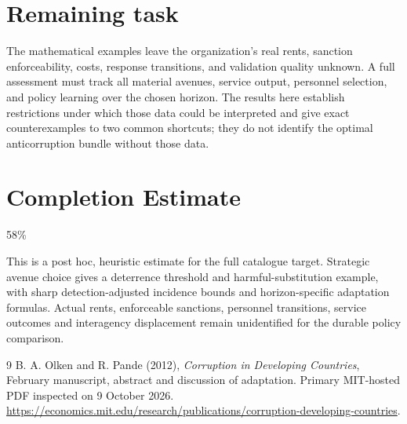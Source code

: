 \documentclass[11pt]{article}
\begin{document}
\section*{Remaining task}
The mathematical examples leave the organization's real rents, sanction enforceability, costs, response transitions, and validation quality unknown. A full assessment must track all material avenues, service output, personnel selection, and policy learning over the chosen horizon. The results here establish restrictions under which those data could be interpreted and give exact counterexamples to two common shortcuts; they do not identify the optimal anticorruption bundle without those data.

\section{Completion Estimate}
58\%

This is a post hoc, heuristic estimate for the full catalogue target.
Strategic avenue choice gives a deterrence threshold and harmful-substitution example, with sharp detection-adjusted incidence bounds and horizon-specific adaptation formulas. Actual rents, enforceable sanctions, personnel transitions, service outcomes and interagency displacement remain unidentified for the durable policy comparison.

\begin{thebibliography}{9}
 B. A. Olken and R. Pande (2012), \emph{Corruption in Developing Countries}, February manuscript, abstract and discussion of adaptation. Primary MIT-hosted PDF inspected on 9 October 2026. \url{https://economics.mit.edu/research/publications/corruption-developing-countries}.
\end{thebibliography}
\end{document}

